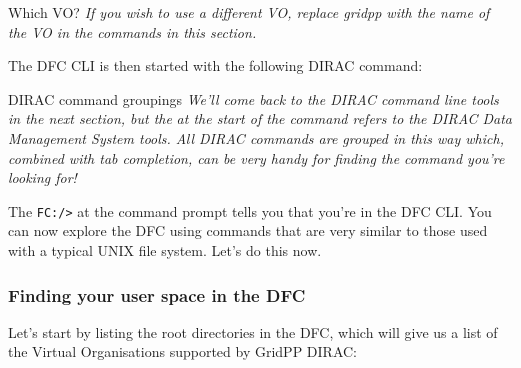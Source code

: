 \begin{warningbox}{Which VO?}
\emph{If you wish to use a different VO, replace gridpp with the name of the
VO in the commands in this section.}
\end{warningbox}

The DFC CLI is then started with the following DIRAC command:

\begin{Shaded}
\begin{Highlighting}[]
\NormalTok{$ } 
 

 \NormalTok{: }
            
\NormalTok{:/}\KeywordTok{>}
\end{Highlighting}
\end{Shaded}

\begin{infobox}{DIRAC command groupings}
\emph{We'll come back to the DIRAC command line tools in the next section, but
the}  \emph{at the start of the command refers to the DIRAC Data
Management System tools. All DIRAC commands are grouped in this way
which, combined with tab completion, can be very handy for finding the
command you're looking for!}
\end{infobox}

The \texttt{FC:/\textgreater{}} at the command prompt tells you that
you're in the DFC CLI. You can now explore the DFC using commands that
are very similar to those used with a typical UNIX file system. Let's do
this now.

\subsubsection{Finding your user space in the DFC}
\label{finding-your-user-space-in-the-dfc}
Let's start by listing the root directories in the DFC, which will give
us a list of the Virtual Organisations supported by GridPP DIRAC:

\begin{Shaded}
\begin{Highlighting}[]
\NormalTok{:/}\KeywordTok{>} 
\end{Highlighting}
\end{Shaded}

